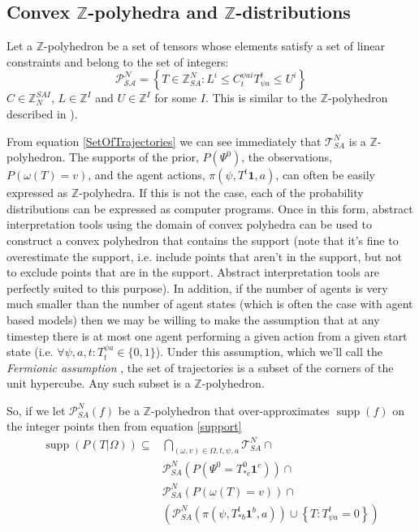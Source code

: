 \documentclass{article}
\DeclareMathOperator\supp{supp}
\begin{document}
\subsection{Convex $\mathbb{Z}$-polyhedra and $\mathbb{Z}$-distributions}
\label{BPoly}

Let a $\mathbb{Z}$-polyhedron be a set of tensors whose elements satisfy a set of linear constraints and belong to the set of integers: 
\[
\mathcal{P^N_{SA}} = \left\{ T\in\mathbb{\mathbb{Z}}^N_{SA} : L^{i} \le  C^{\psi ai}_t T^t_{\psi a} \le U^{i} \right\}
\]
$C \in \mathbb{Z}^{SAI}_{N}$, $L \in \mathbb{Z}^I$ and $U \in \mathbb{Z}^I$ for some $I$. This is similar to the $\mathbb{Z}$-polyhedron described in \cite{quinton1996manipulating}).

From equation \ref{SetOfTrajectories} we can see immediately that $\mathcal{T}^N_{SA}$ is a  $\mathbb{Z}$-polyhedron. The supports of the prior, $P(\Psi^0)$, the observations, $P(\omega(T)=v)$, and the agent actions, $\pi(\psi,T^t\mathbf{1},a)$, can often be easily expressed as $\mathbb{Z}$-polyhedra. If this is not the case, each of the probability distributions can be expressed as computer programs. Once in this form, abstract interpretation tools\cite{cousot1977abstract} using the domain of convex polyhedra  \cite{cousot1978automatic}\cite{becchi2018efficient}\cite{fukuda2020polyhedral} can be used to construct a convex polyhedron that contains the support (note that it's fine to overestimate the support, i.e. include points that aren't in the support, but not to exclude points that are in the support. Abstract interpretation tools\cite{henry2012pagai}\cite{GN2021} are perfectly suited to this purpose). In addition, if the number of agents is very much smaller than the number of agent states (which is often the case with agent based models) then we may be willing to make the assumption that at any timestep there is at most one agent performing a given action from a given start state (i.e. $\forall \psi, a, t: T^{\psi a}_t \in \{0,1\}$). Under this assumption, which we'll call the \textit{Fermionic assumption} , the set of trajectories is a subset of the corners of the unit hypercube. Any such subset is a $\mathbb{Z}$-polyhedron.

So, if we let $\mathcal{P}^N_{SA}(f)$ be a $\mathbb{Z}$-polyhedron that over-approximates $\supp(f)$ on the integer points then from equation \eqref{support}
\begin{equation}
\begin{aligned}
\supp(P( T |\Omega)) \subseteq 
& \bigcap_{(\omega,v) \in \Omega,t,\psi, a} \mathcal{T}^N_{SA} \cap \\
& \mathcal{P}^N_{SA}(P(\Psi^0 = T^0_{* c}\mathbf{1}^c)) \cap\\
&    \mathcal{P}^N_{SA}\left(P\left(\omega(T)=v\right)\right) \cap \\
& 
\left(\mathcal{P}^N_{SA}\left(\pi(\psi,T^t_{* b}\mathbf{1}^b,a)\right)
\cup
\left\{T: T^t_{\psi a} = 0\right\}\right)
\\
\end{aligned}
\label{polyhedralSupport}
\end{equation}
\end{document}
